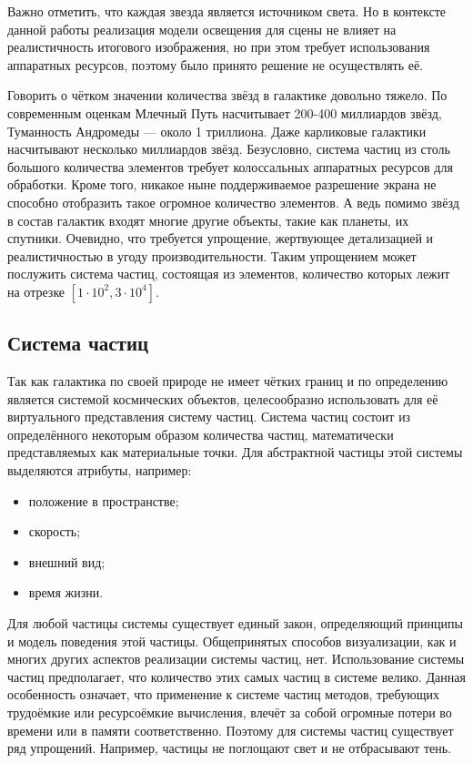 Важно отметить, что каждая звезда является источником света. Но в контексте данной работы реализация модели освещения для сцены не влияет на реалистичность итогового изображения, но при этом требует использования аппаратных ресурсов, поэтому было принято решение не осуществлять её.

Говорить о чётком значении количества звёзд в галактике довольно тяжело. По современным оценкам Млечный Путь насчитывает 200-400 миллиардов звёзд, Туманность Андромеды — около 1 триллиона. Даже карликовые галактики насчитывают несколько миллиардов звёзд. Безусловно, система частиц из столь большого количества элементов требует колоссальных аппаратных ресурсов для обработки. Кроме того, никакое ныне поддерживаемое разрешение экрана не способно отобразить такое огромное количество элементов. А ведь помимо звёзд в состав галактик входят многие другие объекты, такие как планеты, их спутники. Очевидно, что требуется упрощение, жертвующее детализацией и реалистичностью в угоду производительности. Таким упрощением может послужить система частиц, состоящая из элементов, количество которых лежит на отрезке $[1\cdot{}10^2, 3\cdot{}10^4]$.

\subsection{Система частиц}

Так как галактика по своей природе не имеет чётких границ и по определению является системой космических объектов, целесообразно использовать для её виртуального представления систему частиц. Система частиц состоит из определённого некоторым образом количества частиц, математически представляемых как материальные точки. Для абстрактной частицы этой системы выделяются атрибуты\cite{particles}, например:
\begin{itemize}
    \item положение в пространстве;
    \item скорость;
    \item внешний вид;
    \item время жизни.
\end{itemize}

Для любой частицы системы существует единый закон, определяющий принципы и модель поведения этой частицы. Общепринятых способов визуализации, как и многих других аспектов реализации системы частиц, нет. Использование системы частиц предполагает, что количество этих самых частиц в системе велико. Данная особенность означает, что применение к системе частиц методов, требующих трудоёмкие или ресурсоёмкие вычисления, влечёт за собой огромные потери во времени или в памяти соответственно. Поэтому для системы частиц существует ряд упрощений. Например, частицы не поглощают свет и не отбрасывают тень\cite{particles}.

